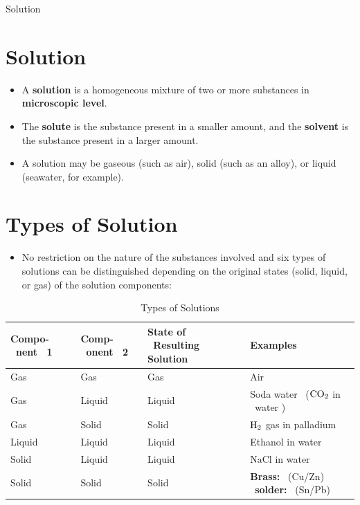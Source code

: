 \documentclass[a4paper,12pt,twocolumn]{article}
\begin{document}
\begin{center}
\huge{Solution} \\[10pt]
\end{center}


\section{Solution}
\begin{itemize}
\item A \textbf{solution} is a homogeneous mixture of two or more substances in \textbf{microscopic level}. 
\item The \textbf{solute} is the substance present in a smaller amount, and the \textbf{solvent} is the substance present in a larger amount. 
\item A solution may be gaseous (such as air), solid (such as an alloy), or liquid (seawater, for example).
\end{itemize}

\section{Types of Solution}
\begin{itemize}
\item No restriction on the nature of the substances involved and  six types of solutions can be distinguished depending on the original states (solid, liquid, or gas) of the solution components:
\end{itemize}
\begin{table}[h]
\small
\centering
\def\arraystretch{1.2}
\begin{tabular}{|p{1.5cm}|p{1.5cm}|p{1.5cm}|p{2cm}|}
\hline Compo- \ nent \ 1 & Comp- \ onent \ 2 & State of \ Resulting Solution & Examples \\
\hline Gas & Gas & Gas & Air \\
\hline Gas & Liquid & Liquid &  Soda water \ ($\ce{CO2}$ in \ water ) \\
\hline Gas & Solid & Solid & $\ce{H2}$ gas in palladium \\
\hline Liquid & Liquid & Liquid & Ethanol in water \\
\hline Solid & Liquid & Liquid & $\mathrm{NaCl}$ in water \\
\hline Solid & Solid & Solid & \textbf{Brass:} \ (Cu/Zn) \ \textbf{solder:} \ (Sn/Pb)\\
\hline
\end{tabular}
\caption{Types of Solutions}
\end{table}
\end{document}
